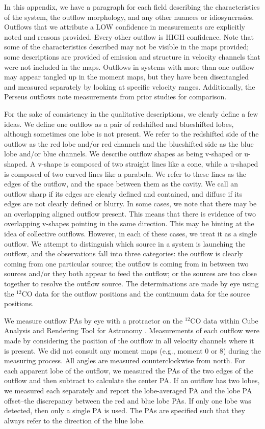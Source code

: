\documentclass[linenumbers,twocolumn, twocolappendix]{aastex631}
\begin{document}
In this appendix, we have a paragraph for each field describing the characteristics of the system, the outflow morphology, and any other nuances or idiosyncrasies. Outflows that we attribute a LOW confidence in measurements are explicitly noted and reasons provided. Every other outflow is HIGH confidence. Note that some of the characteristics described may not be visible in the maps provided; some descriptions are provided of emission and structure in velocity channels that were not included in the maps. Outflows in systems with more than one outflow may appear tangled up in the moment maps, but they have been disentangled and measured separately by looking at specific velocity ranges. Additionally, the Perseus outflows note measurements from prior studies for comparison.

For the sake of consistency in the qualitative descriptions, we clearly define a few ideas. We define one outflow as a pair of redshifted and blueshifted lobes, although sometimes one lobe is not present. We refer to the redshifted side of the outflow as the red lobe and/or red channels and the blueshifted side as the blue lobe and/or blue channels. We describe outflow shapes as being v-shaped or u-shaped. A v-shape is composed of two straight lines like a cone, while a u-shaped is composed of two curved lines like a parabola. We refer to these lines as the edges of the outflow, and the space between them as the cavity. We call an outflow sharp if its edges are clearly defined and contained, and diffuse if its edges are not clearly defined or blurry. In some cases, we note that there may be an overlapping aligned outflow present. This means that there is evidence of two overlapping v-shapes pointing in the same direction. This may be hinting at the idea of collective outflows. However, in each of these cases, we treat it as a single outflow. We attempt to distinguish which source in a system is launching the outflow, and the observations fall into three categories: the outflow is clearly coming from one particular source; the outflow is coming from in between two sources and/or they both appear to feed the outflow; or the sources are too close together to resolve the outflow source. The determinations are made by eye using the $^{12}$CO data for the outflow positions and the continuum data for the source positions. 

We measure outflow PAs by eye with a protractor on the $^{12}$CO data within Cube Analysis and Rendering Tool for Astronomy \citep[CARTA;][]{carta}. Measurements of each outflow were made by considering the position of the outflow in all velocity channels where it is present. We did not consult any moment maps (e.g., moment 0 or 8) during the measuring process. All angles are measured counterclockwise from north. For each apparent lobe of the outflow, we measured the PAs of the two edges of the outflow and then subtract to calculate the center PA. If an outflow has two lobes, we measured each separately and report the lobe-averaged PA and the lobe PA offset--the discrepancy between the red and blue lobe PAs. If only one lobe was detected, then only a single PA is used. The PAs are specified such that they always refer to the direction of the blue lobe.
\end{document}
